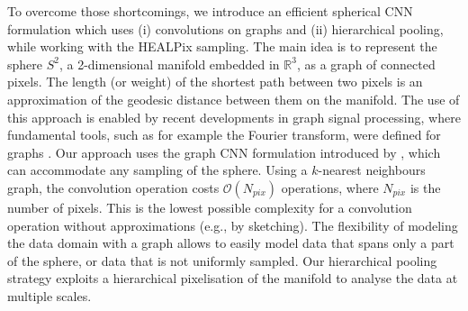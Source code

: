 \documentclass[final,twocolumn,3p,times,authoryear]{elsarticle}
\newcommand{\nati}[1]{{\color[rgb]{.1,.6,.1}{#1}}}
\newcommand{\todo}[1]{{\color[rgb]{.6,.1,.6}{#1}}}
\newcommand{\1}{\b{1}}              %
\newcommand{\0}{\b{0}}              %
\begin{document}
\nati{The part of the sphere/missing data is not really there, but I still do not know how to include it!}

To overcome those shortcomings, we introduce an efficient spherical CNN formulation which uses (i) convolutions on graphs and (ii) hierarchical pooling, while working with the HEALPix sampling.
The main idea is to represent the sphere $S^2$, a 2-dimensional manifold embedded in $\mathbb{R}^3$, as a graph of connected pixels.
The length (or weight) of the shortest path between two pixels is an approximation of the geodesic distance between them on the manifold.
The use of this approach is enabled by recent developments in graph signal processing, where fundamental tools, such as for example the Fourier transform, were defined for graphs \citep{shuman2013emerging}.
Our approach uses the graph CNN formulation introduced by \citet{defferrard2016convolutional}, which can accommodate any sampling of the sphere.
Using a $k$-nearest neighbours graph, the convolution operation costs $\mathcal{O}(N_{pix})$ operations, where $N_{pix}$ is the number of pixels.
This is the lowest possible complexity for a convolution operation without approximations (e.g., by sketching).
The flexibility of modeling the data domain with a graph allows to easily model data that spans only a part of the sphere, or data that is not uniformly sampled.
Our hierarchical pooling strategy exploits a hierarchical pixelisation of the manifold to analyse the data at multiple scales.
\end{document}
